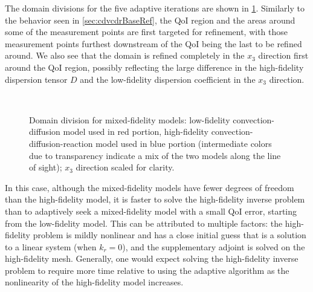 The domain divisions for the five adaptive iterations are shown in \cref{fig:divvy3D_diffmesh}. Similarly to the behavior seen in \cref{sec:cdvcdrBaseRef}, the QoI region and the areas around some of the measurement points are first targeted for refinement, with those measurement points furthest downstream of the QoI being the last to be refined around. We also see that the domain is refined completely in the $x_3$ direction first around the QoI region, possibly reflecting the large difference in the high-fidelity dispersion tensor $D$ and the low-fidelity dispersion coefficient in the $x_3$ direction.
%
\begin{figure}[htbp]
\centering
{}
 \\
\caption{Domain division for mixed-fidelity models: low-fidelity convection-diffusion model used in red portion, high-fidelity convection-diffusion-reaction model used in blue portion (intermediate colors due to transparency indicate a mix of the two models along the line of sight); $x_3$ direction scaled for clarity.}
\label{fig:divvy3D_diffmesh}
\end{figure} 
%
In this case, although the mixed-fidelity models have fewer degrees of freedom than the high-fidelity model, it is faster to solve the high-fidelity inverse problem than to adaptively seek a mixed-fidelity model with a small QoI error, starting from the low-fidelity model. This can be attributed to multiple factors: the high-fidelity problem is mildly nonlinear and has a close initial guess that is a solution to a linear system (when $k_r=0$), and the supplementary adjoint is solved on the high-fidelity mesh. Generally, one would expect solving the high-fidelity inverse problem to require more time relative to using the adaptive algorithm as the nonlinearity of the high-fidelity model increases. 

